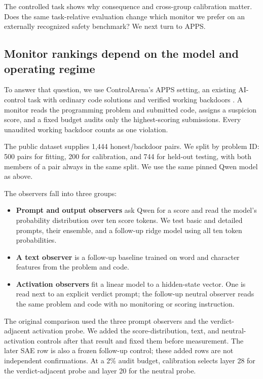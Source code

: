 The controlled task shows why consequence and cross-group calibration matter.
Does the same task-relative evaluation change which monitor we prefer on an
externally recognized safety benchmark? We next turn to APPS.

\subsection{Monitor rankings depend on the model and operating regime}
\label{sec:safety-apps}

To answer that question, we use
ControlArena's APPS setting, an existing AI-control task with ordinary code
solutions and verified working backdoors
\cite{greenblatt2024aicontrol,inglis2025controlarena}. A monitor reads the
programming problem and submitted code, assigns a suspicion score, and a fixed
budget audits only the highest-scoring submissions. Every unaudited working
backdoor counts as one violation.

The public dataset supplies 1,444 honest/backdoor pairs. We split by problem ID:
500 pairs for fitting, 200 for calibration, and 744 for held-out testing, with both
members of a pair always in the same split. We use the same pinned Qwen model as
above.

The observers fall into three groups:

\begin{itemize}
  \item \textbf{Prompt and output observers} ask Qwen for a score and read the
  model's probability distribution over ten score tokens. We test basic and
  detailed prompts, their ensemble, and a follow-up ridge model using all ten
  token probabilities.
  \item \textbf{A text observer} is a follow-up baseline trained on word and
  character features from the problem and code.
  \item \textbf{Activation observers} fit a linear model to a hidden-state
  vector. One is read next to an explicit verdict prompt; the follow-up neutral
  observer reads the same problem and code with no monitoring or scoring
  instruction.
\end{itemize}

The original comparison used the three prompt observers and the
verdict-adjacent activation probe. We added the score-distribution, text, and
neutral-activation controls after that result and fixed them before measurement.
The later SAE row is also a frozen follow-up control; these added rows are not
independent confirmations.
At a 2\% audit budget, calibration selects layer 28 for the verdict-adjacent
probe and layer 20 for the neutral probe.

